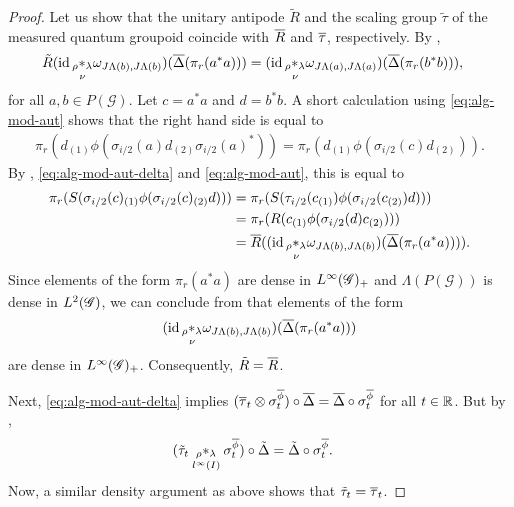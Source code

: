 \begin{proof}
Let us show   that the unitary antipode  $\tilde R$ and the
  scaling group   $\tilde\tau$ of the measured quantum groupoid
  coincide with $\overline{R}$ and $\overline{\tau}$, respectively.
  By \cite[Theorem A.6]{Eno2},
  \begin{align*}
    \tilde R(\operatorname{id} \underset{\nu}{_{\rho} \ast_{\lambda}}
    \omega_{J\Lambda(b),J\Lambda(b)})(\overline{\Delta}(\pi_{r}(a^{*}a))) &= (\operatorname{id}
    \underset{\nu}{_{\rho} \ast_{\lambda}}
    \omega_{J\Lambda(a),J\Lambda(a)})(\overline{\Delta}(\pi_{r}(b^{*}b))),
  \end{align*}
  for all $a,b\in P(\mathscr{G})$.  Let $c=a^{*}a$ and $d=b^{*}b$.  A
  short calculation using \eqref{eq:alg-mod-aut} shows that the right hand
  side is equal to
\begin{align*}
  \pi_{r} ( d_{(1)}\phi(\sigma_{i/2}(a)d_{(2)}\sigma_{i/2}(a)^{*})) =
  \pi_{r}(d_{(1)}\phi(\sigma_{i/2}(c)d_{(2)})).
  \end{align*}
By \cite[Lemma 1.13]{DCT1},  \eqref{eq:alg-mod-aut-delta} and
  \eqref{eq:alg-mod-aut},  this is equal to
  \begin{align*}
   \pi_{r}(S(\sigma_{i/2}(c)_{(1)}\phi(\sigma_{i/2}(c)_{(2)}d))) &=
   \pi_{r}(S(\tau_{i/2}(c_{(1)})\phi(\sigma_{i/2}(c_{(2)})d))) \\
   &= \pi_{r}(R(c_{(1)}\phi(\sigma_{i/2}(d)c_{(2)}))) \\
   &=\overline{R}((\operatorname{id} \underset{\nu}{_{\rho} \ast_{\lambda}}
    \omega_{J\Lambda(b),J\Lambda(b)})(\overline{\Delta}(\pi_{r}(a^{*}a)))).
  \end{align*}
  Since elements of the form $\pi_{r}(a^{*}a)$ are dense in
  $L^{\infty}(\mathscr{G})_{+}$ and $\Lambda(P(\mathscr{G}))$ is dense in $L^{2}(\mathscr{G})$, we
  can conclude from \cite[Theorem A.7]{Eno2} that elements of the form
  \begin{align*}
  (\operatorname{id} \underset{\nu}{_{\rho}
    \ast_{\lambda}}
  \omega_{J\Lambda(b),J\Lambda(b)})(\overline{\Delta}(\pi_{r}(a^{*}a)))  
  \end{align*}
 are
  dense in $L^{\infty}(\mathscr{G})_{+}$. Consequently, $\tilde R=\overline{R}$. 

Next,  \eqref{eq:alg-mod-aut-delta} implies $(\overline{\tau}_{t} \otimes
  \sigma^{\overline{\phi}}_{t}) \circ \overline{\Delta} = \overline{\Delta} \circ
  \sigma^{\overline{\phi}}_{t}$ for all $t\in \mathbb{R}$.  But by \cite[Theorem
  A.5]{Eno2},
  \begin{align*}
    (\tilde \tau_{t} \underset{l^{\infty}(I)}{_{\rho}\ast_{\lambda}} \sigma^{\overline{\phi}}_{t}) \circ \tilde \Delta
    &=\tilde \Delta \circ \sigma^{\overline{\phi}}_{t}.
  \end{align*}
Now,  a similar density  argument as above shows that
  $\tilde \tau_{t}=\overline{\tau}_{t}$.
\end{proof}

